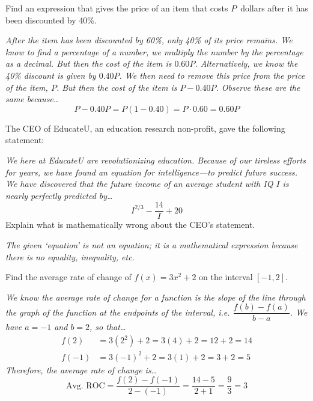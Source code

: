 \documentclass[12pt,letterpaper]{exam}
\begin{document}
\examtitle
{} 
\scores
\bottomline
\newpage


\begin{questions}

\question[5] Find an expression that gives the price of an item that costs $P$~dollars after it has been discounted by 40\%. \pspace

{\itshape After the item has been discounted by 60\%, only 40\% of its price remains. We know to find a percentage of a number, we multiply the number by the percentage as a decimal. But then the cost of the item is $0.60 P$. Alternatively, we know the 40\% discount is given by $0.40P$. We then need to remove this price from the price of the item, $P$. But then the cost of the item is $P - 0.40P$. Observe these are the same because\dots
	\[
	P - 0.40P= P(1 - 0.40)= P \cdot 0.60= 0.60P
	\]
} \pvspace{3.8cm}



\question[5] The CEO of EducateU, an education research non-profit, gave the following statement:

{\itshape We here at EducateU are revolutionizing education. Because of our tireless efforts for years, we have found an equation for intelligence---to predict future success. We have discovered that the future income of an average student with IQ $I$ is nearly perfectly predicted by\dots
	\[
	I^{2/3} - \dfrac{14}{I} + 20
	\]
}
Explain what is mathematically wrong about the CEO's statement. \pvspace{1.83cm}

{\itshape The given `equation' is not an equation; it is a mathematical expression because there is no equality, inequality, etc.}



\newpage
\question[15] Find the average rate of change of $f(x)= 3x^2 + 2$ on the interval $[-1, 2]$. \pspace

{\itshape \tsol We know the average rate of change for a function is the slope of the line through the graph of the function at the endpoints of the interval, i.e. $\dfrac{f(b) - f(a)}{b - a}$. We have $a= -1$ and $b= 2$, so that\dots
	\[
	\begin{aligned}
	f(2)&= 3(2^2) + 2= 3(4) + 2= 12 + 2= 14 \\[0.3cm]
	f(-1)&= 3(-1)^2 + 2= 3(1) + 2= 3 + 2= 5
	\end{aligned}
	\]
Therefore, the average rate of change is\dots
	\[
	\text{Avg. ROC}= \dfrac{f(2) - f(-1)}{2 - (-1)}= \dfrac{14 - 5}{2 + 1}= \dfrac{9}{3}= 3
	\]
}




\end{questions}
\end{document}
